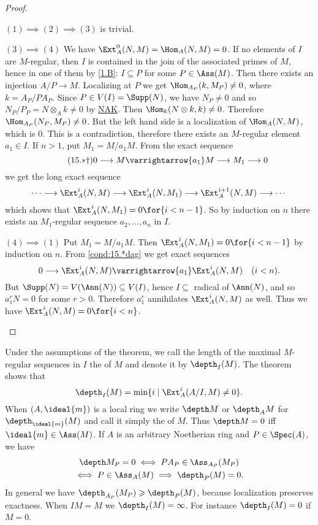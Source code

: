 \documentclass[../main]{subfiles}
\begin{document}
\begin{proof}\phantom{,}
\begin{implyenumerate}
    \item[$(1)\implies(2)\implies(3)$] is trivial.
    \item[$(3)\implies(4)$]We have $\Ext_A^0(N, M)=\Hom_A(N, M)=0$. If no elements of $I$ are $M$-regular, then $I$ is contained in the join of the associated primes of $M$, hence in one of them by \ref{1.B}: $I\subseteq P$ for some $P \in \Ass(M)$. Then there exists an injection $A / P \longrightarrow M$. Localizing at $P$ we get $\Hom_{A_P}(k, M_P) \neq 0$, where $k=A_P/PA_P$. Since $P \in V(I)=\Supp(N)$, we have $N_P \neq 0$ and so $N_P / P_P=N \otimes_A k \neq 0$ by \hyperref[NAK]{NAK}. Then $\Hom_k(N \otimes k, k) \neq 0$. Therefore $\Hom_{A_P}(N_P, M_P) \neq0$. But the left hand side is a localization of $\Hom_A(N, M)$, which is $0$. This is a contradiction, therefore there exists an $M$-regular element $a_1 \in I$. If $n>1$, put $M_1=M / a_1 M$. From the exact sequence
    \[\tag{15.$\ast \dagger$} \label{cond:15.*dag}0\longrightarrow M\varrightarrow{a_1}M\longrightarrow M_1\longrightarrow 0
    \]
    we get the long exact sequence \[\cdots\longrightarrow\Ext_A^i(N, M)\longrightarrow\Ext_A^i(N, M_1) \longrightarrow \Ext_A^{i+1}(N, M) \longrightarrow \cdots\] which shows that $\Ext_A^i(N, M_1)=0\for{i<n-1}$. So by induction on $n$ there exists an $M_1$-regular sequence $a_2, \ldots, a_n$ in $I$.
    \item[$(4)\implies(1)$] Put $M_1=M / a_1 M$. Then $\Ext_A^i(N, M_1)=0\for{i<n-1}$ by induction on $n$. From \ref{cond:15.*dag} we get exact sequences \[0 \longrightarrow \Ext_A^i(N, M) \varrightarrow{a_1}\Ext_{A}^{i}(N, M)\quad(i<n).\] But $\Supp(N)=V(\Ann(N)) \subseteq V(I)$, hence $I \subseteq$ radical of $\Ann(N)$, and so $a_1^r N=0$ for some $r>0$. Therefore $a_1^r$ annihilates $\Ext_A^i(N, M)$ as well. Thus we have $\Ext_A^i(N, M)=0\for{i<n}$.
\end{implyenumerate}
\end{proof}

Under the assumptions of the theorem, we call the length of the maximal $M$-regular sequences in $I$ the  of $M$ and denote it by $\depth_I(M)$. The theorem shows that \[\depth_I(M)=\min \{i \mid \Ext_A^i(A / I, M) \neq 0\}.\] When $(A,\ideal{m})$ is a local ring we write $\depth M$ or $\depth_AM$ for $\depth_{\ideal{m}}(M)$ and call it simply the  of $M$. Thus $\depth M=0$ iff $\ideal{m} \in \Ass(M)$. If $A$ is an arbitrary Noetherian ring and $P \in \Spec(A)$, we have \begin{gather*}\depth M_P=0 \iff P A_P \in\Ass_{A_P}(M_P)\\\iff P \in\Ass_A(M)\implies \depth_P(M)=0.\end{gather*} In general we have $\depth_{A_P}(M_P) \geqslant \depth_P(M)$, because localization preserves exactness. When $I M=M$ we $\depth_I(M)=\infty$. For instance $\depth_I(M)=0$ if $M=0$.
\end{document}
